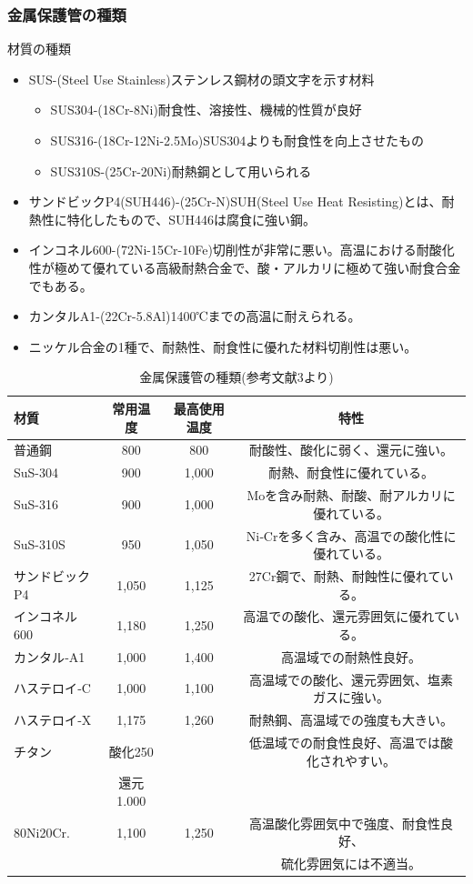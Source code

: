 \documentclass[a4j,twoside,openright,11pt]{jarticle}
\begin{document}
\subsubsection{金属保護管の種類}
材質の種類
\begin{itemize}
\item SUS-(Steel Use Stainless)ステンレス鋼材の頭文字を示す材料
\begin{itemize}
\item SUS304-(18Cr-8Ni)耐食性、溶接性、機械的性質が良好
\item SUS316-(18Cr-12Ni-2.5Mo)SUS304よりも耐食性を向上させたもの
\item SUS310S-(25Cr-20Ni)耐熱鋼として用いられる
\end{itemize}
\item サンドビックP4(SUH446)-(25Cr-N)SUH(Steel Use Heat Resisting)とは、耐熱性に特化したもので、SUH446は腐食に強い鋼。
\item インコネル600-(72Ni-15Cr-10Fe)切削性が非常に悪い。高温における耐酸化性が極めて優れている高級耐熱合金で、酸・アルカリに極めて強い耐食合金でもある。
\item カンタルA1-(22Cr-5.8Al)1400℃までの高温に耐えられる。
\item ニッケル合金の1種で、耐熱性、耐食性に優れた材料切削性は悪い。
\end{itemize}


\begin{table}[htb]
\begin{center}
  \caption{金属保護管の種類(参考文献3より)}
  \begin{tabular}{l|c|c|c}
\hline
材質&常用温度&最高使用温度&特性\\
\hline
\hline
普通鋼 &800&800&耐酸性、酸化に弱く、還元に強い。\\
SuS-304 &
900
&
1,000
&耐熱、耐食性に優れている。\\
SuS-316 &
900
&
1,000
&Moを含み耐熱、耐酸、耐アルカリに優れている。\\
SuS-310S &
950
&
1,050
&Ni‐Crを多く含み、高温での酸化性に優れている。\\
サンドビックP4 &
1,050
&
1,125
&27Cr鋼で、耐熱、耐蝕性に優れている。\\
インコネル600 &
1,180
&
1,250
&高温での酸化、還元雰囲気に優れている。\\
カンタル‐A1 &
1,000
&
1,400
&高温域での耐熱性良好。\\
ハステロイ‐C &
1,000
&
1,100
&高温域での酸化、還元雰囲気、塩素ガスに強い。\\
ハステロイ‐X &
1,175
&
1,260
&耐熱鋼、高温域での強度も大きい。\\
チタン &
酸化250
&
&低温域での耐食性良好、高温では酸化されやすい。\\
&還元1.000&&\\
80Ni20Cr. &
1,100
&
1,250
&高温酸化雰囲気中で強度、耐食性良好、\\
&&&硫化雰囲気には不適当。\\
\hline
  \end{tabular}
\end{center}
\end{table}
\end{document}
